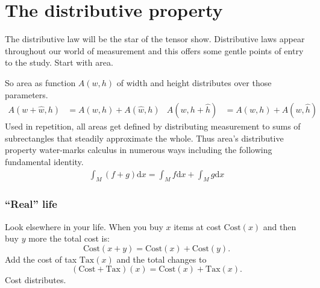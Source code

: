 
\chapter{The distributive property}

The distributive law will be the star of the tensor show.   Distributive laws
appear throughout our world of measurement and this offers some gentle points 
of entry to the study.  
Start with area.
\begin{center}
\hspace{1in}
\end{center}
So area as  function $A(w,h)$ of width and height distributes over those parameters.
\begin{align*}
    A(w+\hat{w},h) &= A(w,h)+A(\hat{w},h)
    &    A(w,h+\hat{h}) &= A(w,h)+A(w,\hat{h})
\end{align*}
Used in repetition, all areas get defined by distributing measurement to 
sums of subrectangles that steadily approximate the whole.
Thus area's distributive property water-marks calculus 
in numerous ways including the following fundamental identity.
\begin{align*}
    \int_M (f+g)\text{d}x = \int_M f \text{d}x + \int_M g \text{d}x
\end{align*}

\subsection{``Real'' life}
Look elsewhere in your life.  When you buy $x$ items at cost $\text{Cost}(x)$
and then buy $y$ more the total cost is:
\[
    \text{Cost}(x+y)=\text{Cost}(x)+\text{Cost}(y).
\]  
Add the cost of tax $\text{Tax}(x)$ and the total changes to 
\[
    (\text{Cost}+\text{Tax})(x)=\text{Cost}(x)+\text{Tax}(x).
\]
Cost distributes.  

